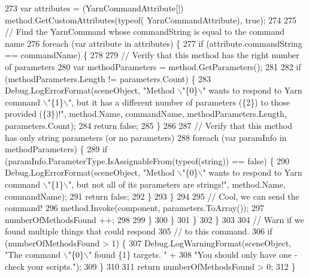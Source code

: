 \begin{DoxyCode}
273                     var attributes = (YarnCommandAttribute[]) method.GetCustomAttributes(typeof(
      YarnCommandAttribute), \textcolor{keyword}{true});
274 
275                     \textcolor{comment}{// Find the YarnCommand whose commandString is equal to the command name}
276                     \textcolor{keywordflow}{foreach} (var attribute \textcolor{keywordflow}{in} attributes) \{
277                         \textcolor{keywordflow}{if} (attribute.commandString == commandName) \{
278 
279                             \textcolor{comment}{// Verify that this method has the right number of parameters}
280                             var methodParameters = method.GetParameters();
281 
282                             \textcolor{keywordflow}{if} (methodParameters.Length != parameters.Count) \{
283                                 Debug.LogErrorFormat(sceneObject, \textcolor{stringliteral}{"Method \(\backslash\)"\{0\}\(\backslash\)" wants to respond to Yarn
       command \(\backslash\)"\{1\}\(\backslash\)", but it has a different number of parameters (\{2\}) to those provided (\{3\})!"}, method.Name, 
      commandName, methodParameters.Length, parameters.Count);
284                                 \textcolor{keywordflow}{return} \textcolor{keyword}{false};
285                             \}
286 
287                             \textcolor{comment}{// Verify that this method has only string parameters (or no parameters)}
288                             \textcolor{keywordflow}{foreach} (var paramInfo \textcolor{keywordflow}{in} methodParameters) \{
289                                 \textcolor{keywordflow}{if} (paramInfo.ParameterType.IsAssignableFrom(typeof(\textcolor{keywordtype}{string})) == \textcolor{keyword}{false}) \{
290                                     Debug.LogErrorFormat(sceneObject, \textcolor{stringliteral}{"Method \(\backslash\)"\{0\}\(\backslash\)" wants to respond to
       Yarn command \(\backslash\)"\{1\}\(\backslash\)", but not all of its parameters are strings!"}, method.Name, commandName);
291                                     \textcolor{keywordflow}{return} \textcolor{keyword}{false};
292                                 \}
293                             \}
294 
295                             \textcolor{comment}{// Cool, we can send the command!}
296                             method.Invoke(component, parameters.ToArray());
297                             numberOfMethodsFound ++;
298 
299                         \}
300                     \}
301                 \} 
302             \}
303 
304             \textcolor{comment}{// Warn if we found multiple things that could respond}
305             \textcolor{comment}{// to this command.}
306             \textcolor{keywordflow}{if} (numberOfMethodsFound > 1) \{
307                 Debug.LogWarningFormat(sceneObject, \textcolor{stringliteral}{"The command \(\backslash\)"\{0\}\(\backslash\)" found \{1\} targets. "} +
308                     \textcolor{stringliteral}{"You should only have one - check your scripts."});
309             \}
310 
311             \textcolor{keywordflow}{return} numberOfMethodsFound > 0;
312         \}
\end{DoxyCode}
